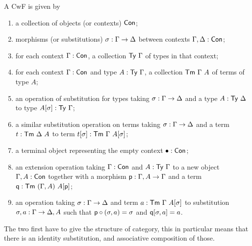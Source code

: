 A \acrshort{CwF} is given by
\begin{enumerate}
  \item a collection of objects (or contexts) \(\mathsf{Con}\);
  \item morphisms (or substitutions) \(\sigma : \Gamma \to \Delta\) between contexts
  \(\Gamma, \Delta : \mathsf{Con}\);
  \item for each context \(\Gamma : \mathsf{Con}\), a collection \(\mathsf{Ty}\ \Gamma\) of types in
  that context;
  \item for each context \(\Gamma : \mathsf{Con}\) and type \(A : \mathsf{Ty}\ \Gamma\), a collection
  \(\mathsf{Tm}\ \Gamma\ A\) of terms of type \(A\);
  \item an operation of substitution for types taking \(\sigma : \Gamma \to \Delta\)
  and a type \(A : \mathsf{Ty}\ \Delta\) to type \(A[\sigma] : \mathsf{Ty}\ \Gamma\);
  \item \label{item:term-subst} a similar substitution operation on terms taking
  \(\sigma : \Gamma \to \Delta\) and a term \(t : \mathsf{Tm}\ \Delta\ A\) to term
  \(t[\sigma] : \mathsf{Tm}\ \Gamma\ A[\sigma]\);
  \item a terminal object representing the empty context \(\bullet : \mathsf{Con}\);
  \item an extension operation taking \(\Gamma : \mathsf{Con}\) and \(A : \mathsf{Ty}\ \Gamma\)
  to a new object \(\Gamma, A : \mathsf{Con}\) together with a morphism
  \(\mathsf{p} : \Gamma, A \to \Gamma\) and a term \(\pq : \CTm\ (\Ga, A)\ A[\pp]\);
  \item an operation taking \(\sigma : \Gamma \to \Delta\) and term
  \(a : \CTm\ \Ga\ A[\sigma]\) to substitution \(\sigma, a : \Gamma \to \Delta, A\)
  such that \(\mathsf{p} \circ (\sigma, a) = \sigma\) and \(\mathsf{q}[\sigma, a] = a\).
\end{enumerate}
The two first have to give the structure of category, this in particular means
that there is an identity substitution, and associative composition of those.

